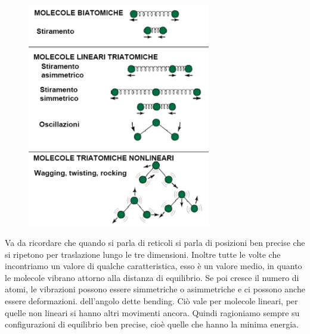 \begin{figure}[H]
    \centering
    \includegraphics[width=8cm]{immagini/vibrazioni.png}
\end{figure}

Va da ricordare che quando si parla di reticoli si parla di posizioni ben precise che si ripetono per traslazione lungo le tre dimensioni. Inoltre tutte le volte che incontriamo un valore di qualche caratteristica, esso è un valore medio, in quanto le molecole vibrano attorno alla distanza di equilibrio. Se poi cresce il numero di atomi, le vibrazioni possono essere simmetriche o asimmetriche e ci possono anche essere deformazioni. dell'angolo dette bending. Ciò vale per molecole lineari, per quelle non lineari si hanno altri movimenti ancora. Quindi ragioniamo sempre su configurazioni di equilibrio ben precise, cioè quelle che hanno la minima energia.
